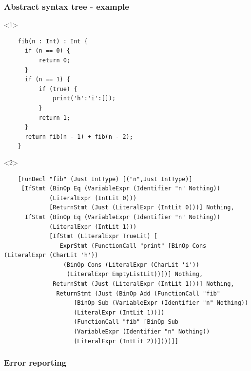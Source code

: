 \documentclass{beamer}
\begin{document}
\begin{frame}[fragile]
  \frametitle{Abstract syntax tree - example}
  \begin{onlyenv}<1>
  \begin{verbatim}
    fib(n : Int) : Int {
      if (n == 0) {
          return 0;
      }
      if (n == 1) {
          if (true) {
              print('h':'i':[]);
          }
          return 1;
      }
      return fib(n - 1) + fib(n - 2);
    }
  \end{verbatim}
  \end{onlyenv}

  \begin{onlyenv}<2>
  \begin{verbatim}
    [FunDecl "fib" (Just IntType) [("n",Just IntType)] 
     [IfStmt (BinOp Eq (VariableExpr (Identifier "n" Nothing)) 
             (LiteralExpr (IntLit 0))) 
             [ReturnStmt (Just (LiteralExpr (IntLit 0)))] Nothing,
      IfStmt (BinOp Eq (VariableExpr (Identifier "n" Nothing))
             (LiteralExpr (IntLit 1))) 
             [IfStmt (LiteralExpr TrueLit) [
                ExprStmt (FunctionCall "print" [BinOp Cons (LiteralExpr (CharLit 'h'))
                 (BinOp Cons (LiteralExpr (CharLit 'i'))
                  (LiteralExpr EmptyListLit))])] Nothing,
              ReturnStmt (Just (LiteralExpr (IntLit 1)))] Nothing,
               ReturnStmt (Just (BinOp Add (FunctionCall "fib"
                    [BinOp Sub (VariableExpr (Identifier "n" Nothing))
                    (LiteralExpr (IntLit 1))]) 
                    (FunctionCall "fib" [BinOp Sub 
                    (VariableExpr (Identifier "n" Nothing)) 
                    (LiteralExpr (IntLit 2))])))]]
  \end{verbatim}
\end{onlyenv}

\end{frame}


\begin{frame}
  \frametitle{Error reporting}
\end{frame}
\end{document}
